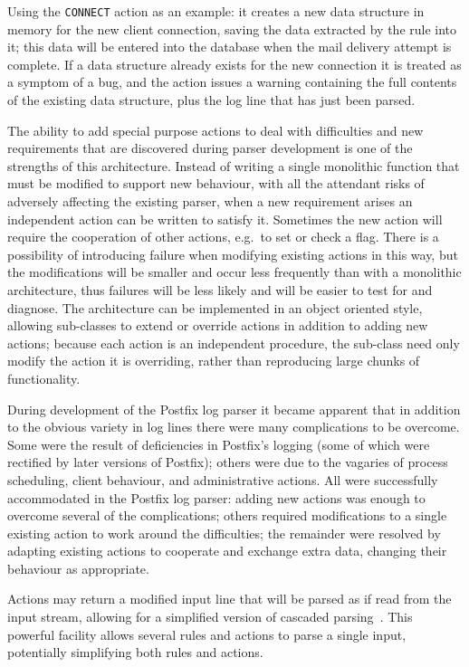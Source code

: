 \documentclass{svmult}
\begin{document}
Using the \texttt{CONNECT} action as an example: it creates a new data
structure in memory for the new client connection, saving the data
extracted by the rule into it; this data will be entered into the database
when the mail delivery attempt is complete.  If a data structure already
exists for the new connection it is treated as a symptom of a bug, and the
action issues a warning containing the full contents of the existing data
structure, plus the log line that has just been parsed.

The ability to add special purpose actions to deal with difficulties and
new requirements that are discovered during parser development is one of
the strengths of this architecture.  Instead of writing a single monolithic
function that must be modified to support new behaviour, with all the
attendant risks of adversely affecting the existing parser, when a new
requirement arises an independent action can be written to satisfy it.
Sometimes the new action will require the cooperation of other actions,
e.g.\ to set or check a flag.  There is a possibility of introducing
failure when modifying existing actions in this way, but the modifications
will be smaller and occur less frequently than with a monolithic
architecture, thus failures will be less likely and will be easier to test
for and diagnose.  The architecture can be implemented in an object
oriented style, allowing sub-classes to extend or override actions in
addition to adding new actions; because each action is an independent
procedure, the sub-class need only modify the action it is overriding,
rather than reproducing large chunks of functionality.

During development of the Postfix log parser it became apparent that in
addition to the obvious variety in log lines there were many complications
to be overcome.  Some were the result of deficiencies in Postfix's logging
(some of which were rectified by later versions of Postfix); others were
due to the vagaries of process scheduling, client behaviour, and
administrative actions.  All were successfully accommodated in the Postfix
log parser: adding new actions was enough to overcome several of the
complications; others required modifications to a single existing action to
work around the difficulties; the remainder were resolved by adapting
existing actions to cooperate and exchange extra data, changing their
behaviour as appropriate.

Actions may return a modified input line that will be parsed as if read
from the input stream, allowing for a simplified version of cascaded
parsing~\cite{cascaded-parsing}.  This powerful facility allows several
rules and actions to parse a single input, potentially simplifying both
rules and actions.
\end{document}
